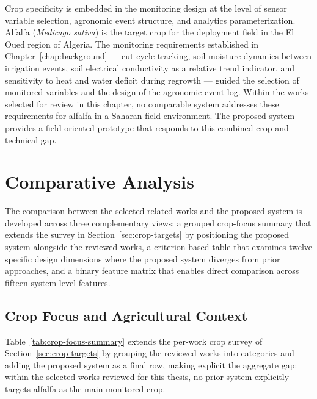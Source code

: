 Crop specificity is embedded in the monitoring design at the level of sensor
variable selection, agronomic event structure, and analytics parameterization.
Alfalfa (\textit{Medicago sativa}) is the target crop for the deployment field
in the El Oued region of Algeria. The monitoring requirements established in
Chapter~\ref{chap:background} --- cut-cycle tracking, soil moisture dynamics
between irrigation events, soil electrical conductivity as a relative trend
indicator, and sensitivity to heat and water deficit during regrowth --- guided
the selection of monitored variables and the design of the agronomic event log.
Within the works selected for review in this chapter, no comparable system
addresses these requirements for alfalfa in a Saharan field environment. The
proposed system provides a field-oriented prototype that responds to this
combined crop and technical gap.

\section{Comparative Analysis}
\label{sec:comparative-analysis}

The comparison between the selected related works and the proposed system is
developed across three complementary views: a grouped crop-focus summary that
extends the survey in Section~\ref{sec:crop-targets} by positioning the
proposed system alongside the reviewed works, a criterion-based table that
examines twelve specific design dimensions where the proposed system diverges
from prior approaches, and a binary feature matrix that enables direct
comparison across fifteen system-level features.

\subsection*{Crop Focus and Agricultural Context}

Table~\ref{tab:crop-focus-summary} extends the per-work crop survey of
Section~\ref{sec:crop-targets} by grouping the reviewed works into categories
and adding the proposed system as a final row, making explicit the aggregate
gap: within the selected works reviewed for this thesis, no prior system
explicitly targets alfalfa as the main monitored crop.

